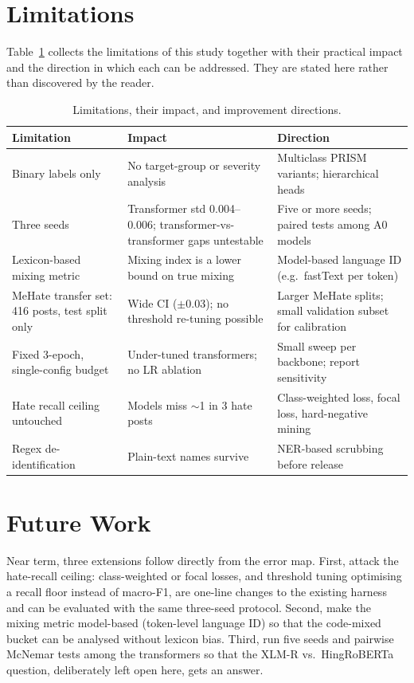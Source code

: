 \section{Limitations}
\label{sec:limits}

Table~\ref{tab:limits} collects the limitations of this study together with their
practical impact and the direction in which each can be addressed. They are
stated here rather than discovered by the reader.

\begin{table}[htbp]
\centering
\caption{Limitations, their impact, and improvement directions.}
\label{tab:limits}
\small
\begin{tabular}{>{\raggedright\arraybackslash}p{3.7cm}>{\raggedright\arraybackslash}p{5.2cm}>{\raggedright\arraybackslash}p{4.4cm}}
\toprule
Limitation & Impact & Direction \\
\midrule
Binary labels only & No target-group or severity analysis & Multiclass PRISM variants; hierarchical heads \\
Three seeds & Transformer std 0.004--0.006; transformer-vs-transformer gaps untestable & Five or more seeds; paired tests among A0 models \\
Lexicon-based mixing metric & Mixing index is a lower bound on true mixing & Model-based language ID (e.g.\ fastText per token) \\
MeHate transfer set: 416 posts, test split only & Wide CI ($\pm$0.03); no threshold re-tuning possible & Larger MeHate splits; small validation subset for calibration \\
Fixed 3-epoch, single-config budget & Under-tuned transformers; no LR ablation & Small sweep per backbone; report sensitivity \\
Hate recall ceiling untouched & Models miss $\sim$1 in 3 hate posts & Class-weighted loss, focal loss, hard-negative mining \\
Regex de-identification & Plain-text names survive & NER-based scrubbing before release \\
\bottomrule
\end{tabular}
\end{table}

\section{Future Work}
\label{sec:future}

Near term, three extensions follow directly from the error map. First, attack the
hate-recall ceiling: class-weighted or focal losses, and threshold tuning
optimising a recall floor instead of macro-F1, are one-line changes to the
existing harness and can be evaluated with the same three-seed protocol. Second,
make the mixing metric model-based (token-level language ID) so that the
code-mixed bucket can be analysed without lexicon bias. Third, run five seeds and
pairwise McNemar tests among the transformers so that the XLM-R vs.\ HingRoBERTa
question, deliberately left open here, gets an answer.

